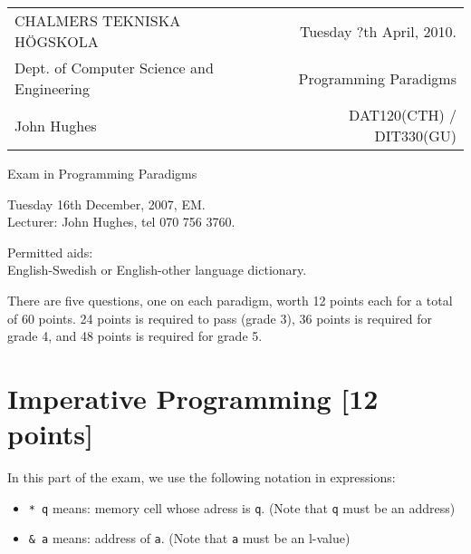 \documentclass{article}
\begin{document}
\noindent
\begin{tabular}{lr}
CHALMERS TEKNISKA H\"OGSKOLA &Tuesday ?th April, 2010.\\
Dept. of Computer Science and Engineering & Programming Paradigms\\
John Hughes                  & DAT120(CTH) / DIT330(GU) \\
\end{tabular}

\vspace{2.5cm} \noindent
\begin{center} {\LARGE
Exam in Programming Paradigms}
\end{center}

\vspace{1.5cm}

\noindent
Tuesday 16th December, 2007, EM.\\
Lecturer: John Hughes, tel 070 756 3760.
\vspace{1cm}

\noindent
Permitted aids:\\
English-Swedish or English-other language dictionary.

There are five questions, one on each paradigm, worth 12 points each
for a total of 60 points. 24 points is required to pass (grade 3), 36
points is required for grade 4, and 48 points is required for grade 5.

\newcommand{\comment}[1]{\marginpar{#1}}

\newpage

\section{Imperative Programming [12 points]}

In this part of the exam, we use the following notation in expressions:

\begin{itemize}
\item
  \verb!* q! means: memory cell whose adress is \verb!q!. (Note that
  \verb!q! must be an address)
\item
  \verb!& a! means: address of \verb!a!. (Note that \verb!a! must be
  an l-value)
\end{itemize}
\end{document}
